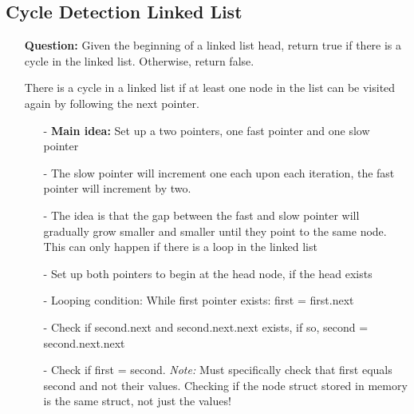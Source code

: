\documentclass[12pt]{article}
\begin{document}
\subsection{Cycle Detection Linked List}
\begin{enumerate}
  \item[] \textbf{Question:} Given the beginning of a linked list head, return true if there is a cycle in the linked list. Otherwise, return false.

There is a cycle in a linked list if at least one node in the list can be visited again by following the next pointer.

    \begin{enumerate}
      \item[-] \textbf{Main idea:} Set up a two pointers, one fast pointer and one slow pointer
      \item[-] The slow pointer will increment one each upon each iteration, the fast pointer will increment by two.
      \item[-] The idea is that the gap between the fast and slow pointer will gradually grow smaller and smaller until they point to the same node. This can only happen if there is a loop in the linked list
      \item[-] Set up both pointers to begin at the head node, if the head exists
      \item[-] Looping condition: While first pointer exists: first = first.next
      \item[-] Check if second.next and second.next.next exists, if so, second = second.next.next
      \item[-] Check if first = second. \textit{Note:} Must specifically check that first equals second and not their values. Checking if the node struct stored in memory is the same struct, not just the values!
    \end{enumerate}
\end{enumerate}
\end{document}

